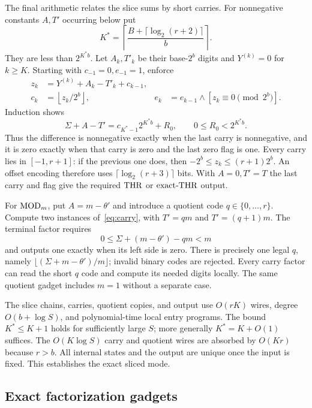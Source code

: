 The final arithmetic relates the slice sums by short carries. For
nonnegative constants $A,T'$ occurring below put
\[
 K^*=\left\lceil\frac{B+\lceil\log_2(r+2)\rceil}{b}\right\rceil.
\]
They are less than $2^{K^*b}$. Let $A_k,T'_k$ be their base-$2^b$
digits and $Y^{(k)}=0$ for $k\ge K$. Starting with
$c_{-1}=0,e_{-1}=1$, enforce
\begin{align}
 z_k&=Y^{(k)}+A_k-T'_k+c_{k-1},\nonumber\\
 c_k&=\left\lfloor z_k/2^b\right\rfloor,
 &e_k&=e_{k-1}\wedge[z_k\equiv0\pmod{2^b}].
 \label{eq:carry}
\end{align}
Induction shows
\[
 \Sigma+A-T'=c_{K^*-1}2^{K^*b}+R_0,
 \qquad 0\le R_0<2^{K^*b}.
\]
Thus the difference is nonnegative exactly when the last carry is
nonnegative, and it is zero exactly when that carry is zero and the
last zero flag is one. Every carry lies in $[-1,r+1]$: if the previous
one does, then $-2^b\le z_k\le(r+1)2^b$. An offset encoding therefore
uses $\lceil\log_2(r+3)\rceil$ bits. With $A=0,T'=T$ the last carry
and flag give the required $\mathrm{THR}$ or $\mathrm{exact\text{-}THR}$ output.

For $\mathrm{MOD}_m$, put $A=m-\theta'$ and introduce a quotient code
$q\in\{0,\ldots,r\}$. Compute two instances of~\eqref{eq:carry},
with $T'=qm$ and $T'=(q+1)m$. The terminal factor requires
\[
 0\le\Sigma+(m-\theta')-qm<m
\]
and outputs one exactly when its left side is zero. There is precisely
one legal $q$, namely $\lfloor(\Sigma+m-\theta')/m\rfloor$; invalid
binary codes are rejected. Every carry factor can read the short
$q$ code and compute its needed digits locally. The same quotient
gadget includes $m=1$ without a separate case.

The slice chains, carries, quotient copies, and output use $O(rK)$
wires, degree $O(b+\log S)$, and polynomial-time local entry programs.
The bound $K^*\le K+1$ holds for sufficiently large $S$; more generally
$K^*=K+O(1)$ suffices. The $O(K\log S)$ carry and quotient wires
are absorbed by $O(Kr)$ because $r>b$. All internal states and the
output are unique once the input is fixed. This establishes the exact
sliced mode.

\subsection{Exact factorization gadgets}

